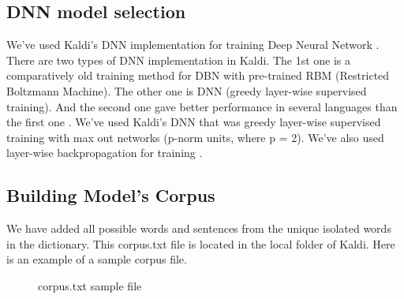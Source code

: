 \documentclass{standalone}
\begin{document}
\subsection{DNN model selection}
We've used Kaldi's DNN implementation for training Deep Neural Network \cite{hinton2012deep}. There are two types of DNN implementation in Kaldi. The 1st one is a comparatively old training method
for DBN with pre-trained RBM (Restricted Boltzmann Machine). The other one is DNN
(greedy layer-wise supervised training). And the second one gave better performance in
several languages than the first one
\cite{zhang2014improving}.  We've used Kaldi's DNN that was greedy layer-wise supervised training with max out networks
(p-norm units, where p = 2). We've also used layer-wise backpropagation for training \cite{seide2011conversational}.

    \subsection{Building Model's Corpus}
  We have added all possible words and sentences from the unique isolated words in the dictionary. This corpus.txt file is located in the local folder of Kaldi. Here is an example of a sample corpus file.
    
    \begin{figure}[h]
 \centering
 \caption{corpus.txt sample file}
\label{fig:corpus}
\end{figure}

    
\end{document}
